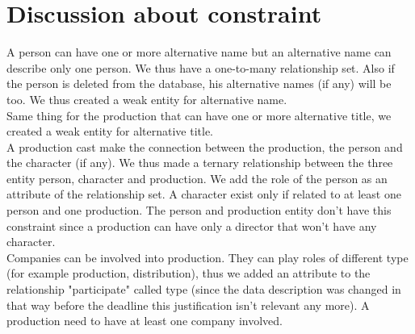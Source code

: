 \documentclass{article}
\begin{document}
\section{Discussion about constraint}
A person can have one or more alternative name but an alternative name can describe only one person. We thus have a one-to-many relationship set. Also if the person is deleted from the database, his alternative names (if any) will be too. We thus created a weak entity for alternative name. \\

Same thing for the production that can have one or more alternative title, we created a weak entity for alternative title. \\

A production cast make the connection between the production, the person and the character (if any). We thus made a ternary relationship between the three entity person, character and production. We add the role of the person as an attribute of the relationship set. A character exist only if related to at least one person and one production. The person and production entity don't have this constraint since a production can have only a director that won't have any character.  \\

Companies can be involved into production. They can play roles of different type (for example production, distribution), thus we added an attribute to the relationship "participate" called type (since the data description was changed in that way before the deadline this justification isn't relevant any more). A production need to have at least one company involved.  \\
 
\end{document}
